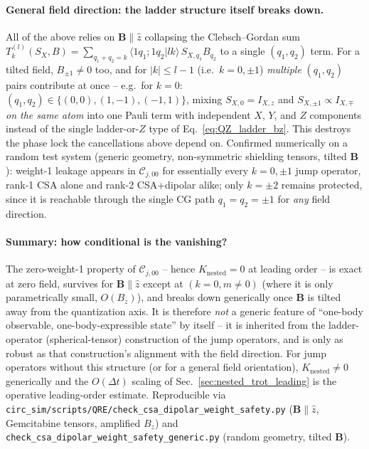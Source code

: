 \documentclass[11pt]{article}
\newcommand{\Dt}{\Delta t}
\newcommand{\calC}{\mathcal{C}}
\begin{document}
\paragraph{General field direction: the ladder structure itself breaks down.} All of the above relies on $\mathbf B\parallel\hat z$ collapsing the Clebsch--Gordan sum $T^{(l)}_k(S_X,B)=\sum_{q_1+q_2=k}\langle1q_1;1q_2|lk\rangle\,S_{X,q_1}B_{q_2}$ to a single $(q_1,q_2)$ term. For a tilted field, $B_{\pm1}\neq0$ too, and for $|k|\le l-1$ (i.e.\ $k=0,\pm1$) \emph{multiple} $(q_1,q_2)$ pairs contribute at once -- e.g.\ for $k=0$: $(q_1,q_2)\in\{(0,0),(1,-1),(-1,1)\}$, mixing $S_{X,0}=I_{X,z}$ and $S_{X,\pm1}\propto I_{X,\mp}$ \emph{on the same atom} into one Pauli term with independent $X$, $Y$, and $Z$ components instead of the single ladder-or-$Z$ type of Eq.~\eqref{eq:QZ_ladder_bz}. This destroys the phase lock the cancellations above depend on. Confirmed numerically on a random test system (generic geometry, non-symmetric shielding tensors, tilted $\mathbf B$): weight-1 leakage appears in $\calC_{j,00}$ for essentially every $k=0,\pm1$ jump operator, rank-1 CSA alone and rank-2 CSA+dipolar alike; only $k=\pm2$ remains protected, since it is reachable through the single CG path $q_1=q_2=\pm1$ for \emph{any} field direction.

\paragraph{Summary: how conditional is the vanishing?} The zero-weight-1 property of $\calC_{j,00}$ -- hence $K_{\text{nested}}=0$ at leading order -- is exact at zero field, survives for $\mathbf B\parallel\hat z$ except at $(k=0,m\neq0)$ (where it is only parametrically small, $O(B_z)$), and breaks down generically once $\mathbf B$ is tilted away from the quantization axis. It is therefore \emph{not} a generic feature of ``one-body observable, one-body-expressible state'' by itself -- it is inherited from the ladder-operator (spherical-tensor) construction of the jump operators, and is only as robust as that construction's alignment with the field direction. For jump operators without this structure (or for a general field orientation), $K_{\text{nested}}\neq0$ generically and the $O(\Dt)$ scaling of Sec.~\ref{sec:nested_trot_leading} is the operative leading-order estimate. Reproducible via \texttt{circ\_sim/scripts/QRE/check\_csa\_dipolar\_weight\_safety.py} ($\mathbf B\parallel\hat z$, Gemcitabine tensors, amplified $B_z$) and \texttt{check\_csa\_dipolar\_weight\_safety\_generic.py} (random geometry, tilted $\mathbf B$).
\end{document}
